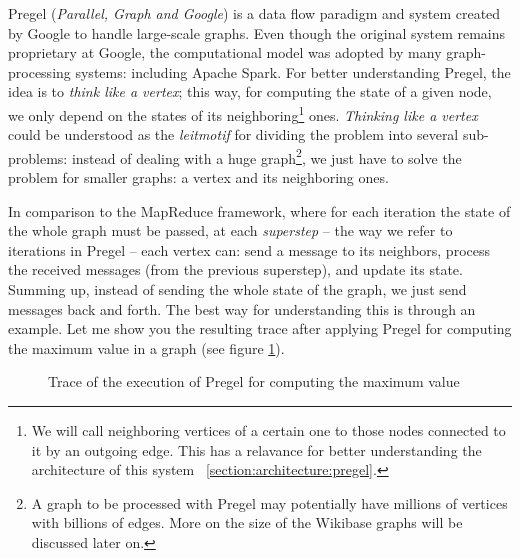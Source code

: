 Pregel (\textit{Parallel, Graph and Google}) is a data flow paradigm and system created by Google to handle large-scale graphs. Even though the original system remains proprietary at Google, the computational model was adopted by many graph-processing systems: including Apache Spark. For better understanding Pregel, the idea is to \textit{think like a vertex}; this way, for computing the state of a given node, we only depend on the states of its neighboring\footnote{We will call neighboring vertices of a certain one to those nodes connected to it by an outgoing edge. This has a relavance for better understanding the architecture of this system ~\ref{section:architecture:pregel}.} ones. \textit{Thinking like a vertex} could be understood as the \textit{leitmotif} for dividing the problem into several sub-problems: instead of dealing with a huge graph\footnote{A graph to be processed with Pregel may potentially have millions of vertices with billions of edges. More on the size of the Wikibase graphs will be discussed later on.}, we just have to solve the problem for smaller graphs: a vertex and its neighboring ones.

In comparison to the MapReduce framework, where for each iteration the state of the whole graph must be passed, at each \textit{superstep} -- the way we refer to iterations in Pregel -- each vertex can: send a message to its neighbors, process the received messages (from the previous superstep), and update its state. Summing up, instead of sending the whole state of the graph, we just send messages back and forth. The best way for understanding this is through an example. Let me show you the resulting trace after applying Pregel for computing the maximum value in a graph (see figure \ref{fig:pregel}).

\begin{figure}[h]
    \centering
    
    \caption[Trace of the execution of Pregel for computing the maximum value]{Trace of the execution of Pregel for computing the maximum value~\cite{10.1145/1807167.1807184}}
    \label{fig:pregel}
\end{figure}


